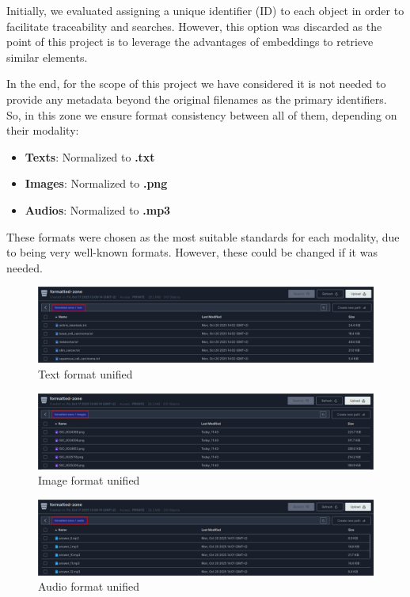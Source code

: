 \documentclass[12pt]{article}
\begin{document}
Initially, we evaluated assigning a unique identifier (ID) to each object in order to facilitate traceability and searches. However, this option was discarded as the point of this project is to leverage the advantages of embeddings to retrieve similar elements.

In the end, for the scope of this project we have considered it is not needed to provide any metadata beyond the original filenames as the primary identifiers. So, in this zone we ensure format consistency between all of them, depending on their modality:
\begin{itemize}
    \item \textbf{Texts}: Normalized to \textbf{.txt}
    \item \textbf{Images}: Normalized to \textbf{.png}
    \item \textbf{Audios}: Normalized to \textbf{.mp3}
\end{itemize}

These formats were chosen as the most suitable standards for each modality, due to being very well-known formats. However, these could be changed if it was needed.

\begin{figure}[H]
    \centering
    \includegraphics[width=1\linewidth]{images/formatted-text.png}
    \caption{Text format unified}
    \label{fig:placeholder}
\end{figure}

\begin{figure}[H]
    \centering
    \includegraphics[width=1\linewidth]{images/formatted-images.png}
    \caption{Image format unified}
    \label{fig:placeholder}
\end{figure}

\begin{figure}[H]
    \centering
    \includegraphics[width=1\linewidth]{images/formatted-audio.png}
    \caption{Audio format unified}
    \label{fig:placeholder}
\end{figure}
\end{document}
